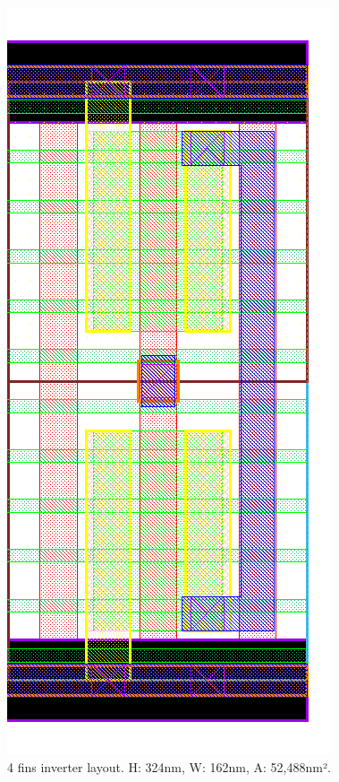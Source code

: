 \documentclass[diss,pgmicro,english]{iiufrgs}
\begin{document}
\begin{figure}[]
\centering
\includegraphics[width=\textwidth,height=\textheight,keepaspectratio]{INV4F.png}
\caption{4 fins inverter layout. H: 324nm, W: 162nm, A: 52,488nm².}
\label{fig:INV4F}
\end{figure}
\end{document}
